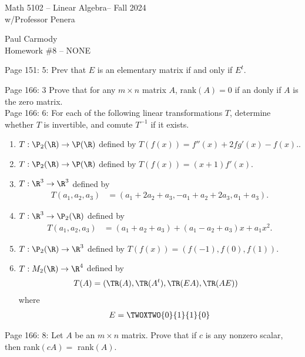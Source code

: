 \documentclass[10pt,a4paper]{report}
\newcommand{\CLASSNAME}{Math 5102 -- Linear Algebra}
\newcommand{\STUDENTNAME}{Paul Carmody}
\newcommand{\ASSIGNMENT}{Homework \#8 }
\newcommand{\DUEDATE}{NONE}
\newcommand{\SEMESTER}{Fall 2024}
\begin{document}
\begin{center}
	\Large{\CLASSNAME -- \SEMESTER} \\
	\large{ w/Professor Penera}
\end{center}
\begin{center}
	\STUDENTNAME \\
	\ASSIGNMENT -- \DUEDATE\\
\end{center} 

\noindent Page 151: 5: Prev that $E$ is an elementary matrix if and only if $E^t$.

\noindent Page 166: 3 Prove that for any $m \times n$ matrix $A$, rank$(A) = 0$ if an donly if $A$ is the zero matrix.\\

\noindent Page 166:  6: For each of the following linear transformations $T$, determine whether $T$ is invertible, and comute $T^{-1}$ if it exists.
\begin{enumerate}[label=(\alph*)]
\item $T: \P_2(\R) \to \P(\R)$ defined by $T(f(x))=f''(x)+2fg'(x)-f(x).$.
\item $T:\P_2(\R) \to \P(\R)$ defined by $T(f(x))=(x+1)f'(x)$.
\item $T: \R^3\to \R^3$ defined by
\begin{align*}
	T(a_1,a_2,a_3) &= (a_1+2a_2+a_3, -a_1+a_2+2a_3,a_1+a_3).
\end{align*} 
\item $T:\R^3 \to \P_2(\R)$ defined by 
\begin{align*}
	T(a_1,a_2,a_3) &= (a_1+a_2+a_3)+(a_1-a_2+a_3)x+a_1x^2.
\end{align*}

\item $T:\P_2(\R) \to \R^3 $ defined by $T(f(x))=(f(-1), f(0),f(1))$.

\item $T: M_{2\time 2}(\R) \to \R^4$ defined by 
\begin{align*}
	T(A) &= (\TR( A), \TR(A^t), \TR(EA), \TR(AE))
\end{align*}where
\begin{align*}
	E=\TWOXTWO{0}{1}{1}{0}
\end{align*}

\end{enumerate}

\noindent Page 166:  8: Let $A$ be an $m \times n$ matrix.  Prove that if $c$ is any nonzero scalar, then rank$(cA) = $ rank$(A)$.\\
\end{document}
